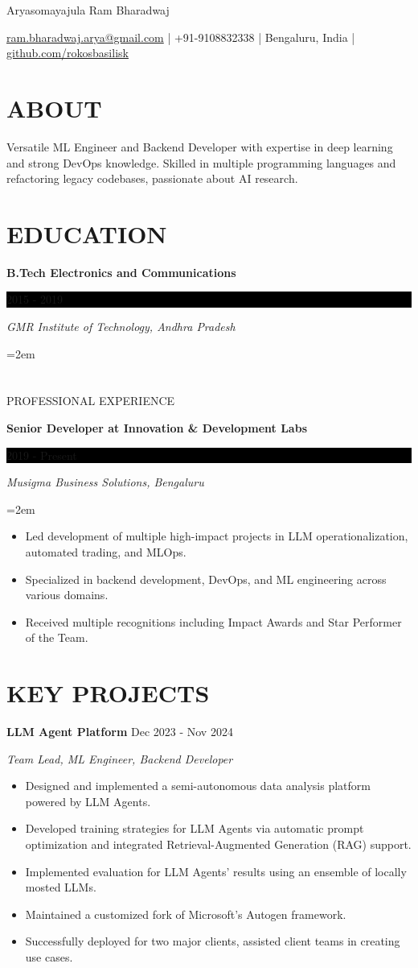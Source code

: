 \documentclass[fontsize=11pt]{article}
\newcommand{\MyName}[1]{
    \Huge \usefont{OT1}{phv}{b}{n} \hfill #1
    \par \normalsize \normalfont}
\newcommand{\NewPart}[1]{\section*{\uppercase{#1}}}
\newcommand{\EducationEntry}[4]{
    \noindent \textbf{#1} \hfill
    \colorbox{Black}{\parbox{8.5em}{\hfill\color{White}#2}} \par
    \noindent \textit{#3} \par
    \noindent\hangindent=2em\hangafter=0 \small #4
    \normalsize \par}
\newcommand{\WorkEntry}[4]{
    \noindent \textbf{#1} \hfill
    \colorbox{Black}{\parbox{9em}{\hfill\color{White}#2}} \par
    \noindent \textit{#3} \par
    \noindent\hangindent=2em\hangafter=0 \small #4
    \normalsize \par}
\newcommand{\ProjectEntry}[4]{
    \noindent \textbf{#1} \hfill {#2} \par
    \noindent \textit{#3} \par
    \noindent \small #4
    \normalsize \par}
\newcommand{\AboutEntry}[1]{
    \noindent #1 \par}
\begin{document}
\MyName{Aryasomayajula Ram Bharadwaj}
\bigskip

{\small \hfill \href{mailto:ram.bharadwaj.arya@gmail.com}{ram.bharadwaj.arya@gmail.com} | +91-9108832338 | Bengaluru, India | \href{https://github.com/rokosbasilisk}{github.com/rokosbasilisk}}

\NewPart{ABOUT}
\AboutEntry{Versatile ML Engineer and Backend Developer with expertise in deep learning and strong DevOps knowledge. Skilled in multiple programming languages and refactoring legacy codebases, passionate about AI research.}

\NewPart{EDUCATION}
\EducationEntry
{B.Tech Electronics and Communications}
{2015 - 2019}
{GMR Institute of Technology, Andhra Pradesh}

\NewPart{PROFESSIONAL EXPERIENCE}

\WorkEntry
{Senior Developer at Innovation \& Development Labs}
{2019 - Present}
{Musigma Business Solutions, Bengaluru}
{%
\begin{itemize}
\item Led development of multiple high-impact projects in LLM operationalization, automated trading, and MLOps.
\item Specialized in backend development, DevOps, and ML engineering across various domains.
\item Received multiple recognitions including Impact Awards and Star Performer of the Team.
\end{itemize}}

\NewPart{KEY PROJECTS}

\ProjectEntry{LLM Agent Platform}{Dec 2023 - Nov 2024}{Team Lead, ML Engineer, Backend Developer}
{%
\begin{itemize}
\item Designed and implemented a semi-autonomous data analysis platform powered by LLM Agents.
\item Developed training strategies for LLM Agents via automatic prompt optimization and integrated Retrieval-Augmented Generation (RAG) support.
\item Implemented evaluation for LLM Agents' results using an ensemble of locally mosted LLMs.
\item Maintained a customized fork of Microsoft's Autogen framework.
\item Successfully deployed for two major clients, assisted client teams in creating use cases.
\end{itemize}}
\end{document}
